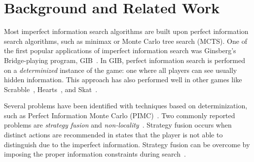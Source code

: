 \documentclass{aamas2015}
\begin{document}


\section{Background and Related Work}

Most imperfect information search algorithms are built upon perfect information search algorithms, such as minimax or Monte Carlo tree search (MCTS). 
One of the first popular applications of imperfect information search was Ginsberg's Bridge-playing program, GIB~\cite{Ginsberg96Partition,Ginsberg01}. 
In GIB, perfect information search is performed on a {\it determinized} instance of the game: one where all players can see usually hidden information. 
This approach has also performed well in other games like Scrabble~\cite{Sheppard02World}, 
Hearts~\cite{Sturtevant08An}, and Skat~\cite{Buro09Improving}. 

Several problems have been identified with techniques based on determinization, such as Perfect Information Monte Carlo
(PIMC)~\cite{Long10Understanding}. 
Two commonly reported problems are {\it strategy fusion} and {\it non-locality}~\cite{Frank98Finding}.
Strategy fusion occurs when distinct actions are recommended in states that the player is not able to distinguish due to the imperfect information.
Strategy fusion can be overcome by imposing the proper information constraints during search~\cite{Frank98Finding,Ciancarini10Kriegspiel,Ponsen11Computing,Lisy12peg,Cowling12ISMCTS}.
\end{document}
